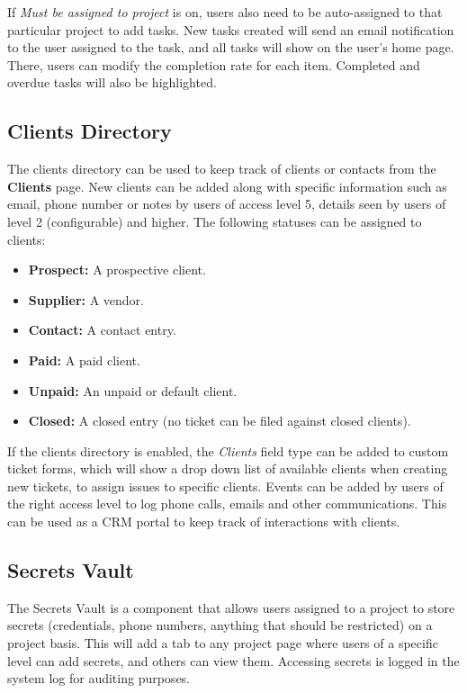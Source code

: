 \documentclass[11pt]{article}
\begin{document}
If \textit{Must be assigned to project} is on, users also need to be auto-assigned to that particular project to add tasks. New tasks created will send an email notification to the user assigned to the task, and all tasks will show on the user's home page. There, users can modify the completion rate for each item. Completed and overdue tasks will also be highlighted.

\subsection{Clients Directory}
The clients directory can be used to keep track of clients or contacts from the \textbf{Clients} page. New clients can be added along with specific information such as email, phone number or notes by users of access level 5, details seen by users of level 2 (configurable) and higher. The following statuses can be assigned to clients:

\begin{itemize}
\item \textbf{Prospect:} A prospective client.
\item \textbf{Supplier:} A vendor.
\item \textbf{Contact:} A contact entry.
\item \textbf{Paid:} A paid client.
\item \textbf{Unpaid:} An unpaid or default client.
\item \textbf{Closed:} A closed entry (no ticket can be filed against closed clients).
\end{itemize}

If the clients directory is enabled, the \textit{Clients} field type can be added to custom ticket forms, which will show a drop down list of available clients when creating new tickets, to assign issues to specific clients. Events can be added by users of the right access level to log phone calls, emails and other communications. This can be used as a CRM portal to keep track of interactions with clients. 

\subsection{Secrets Vault}
The Secrets Vault is a component that allows users assigned to a project to store secrets (credentials, phone numbers, anything that should be restricted) on a project basis. This will add a tab to any project page where users of a specific level can add secrets, and others can view them. Accessing secrets is logged in the system log for auditing purposes.
\end{document}

